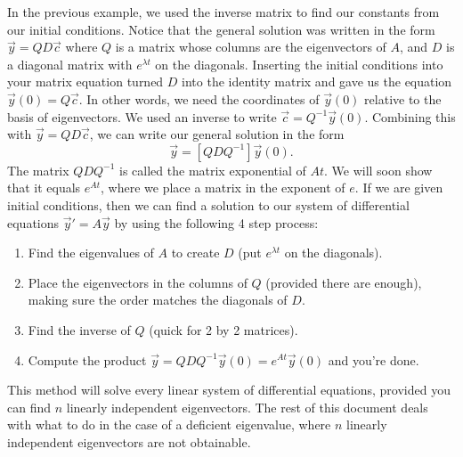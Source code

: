 In the previous example, we used the inverse matrix to find our constants from our initial conditions.  
Notice that the general solution was written in the form $\vec y = QD\vec c$ where $Q$ is a matrix whose columns are the eigenvectors of $A$, and $D$ is a diagonal matrix with $e^{\lambda t}$ on the diagonals.  
Inserting the initial conditions into your matrix equation turned $D$ into the identity matrix and gave us the equation $\vec y(0) = Q\vec c$. In other words, we need the coordinates of $\vec y(0)$ relative to the basis of eigenvectors.  We used an inverse to  write $\vec c = Q^{-1}\vec y(0)$.  Combining this with $\vec y = QD\vec c$, we can write our general solution in the form 
$$\vec y = \left[QDQ^{-1}\right]\vec y(0).$$ 
The matrix $QDQ^{-1}$ is called the matrix exponential of $At$. 
We will soon show that it equals $e^{At}$, where we place a matrix in the exponent of $e$. 
If we are given initial conditions, then we can find a solution to our system of differential equations $\vec y ' = A\vec y$ by using the following 4 step process: 
\begin{enumerate}
	\item Find the eigenvalues of $A$ to create $D$ (put $e^{\lambda t}$ on the diagonals).
	\item Place the eigenvectors in the columns of $Q$ (provided there are enough), making sure the order matches the diagonals of $D$.
	\item Find the inverse of $Q$ (quick for 2 by 2 matrices).
	\item Compute the product $\vec y = QDQ^{-1}\vec y(0) = e^{At}\vec y(0)$ and you're done. 
\end{enumerate}
This method will solve every linear system of differential equations, provided you can find $n$ linearly independent eigenvectors. The rest of this document deals with what to do in the case of a deficient eigenvalue, where $n$ linearly independent eigenvectors are not obtainable. 



